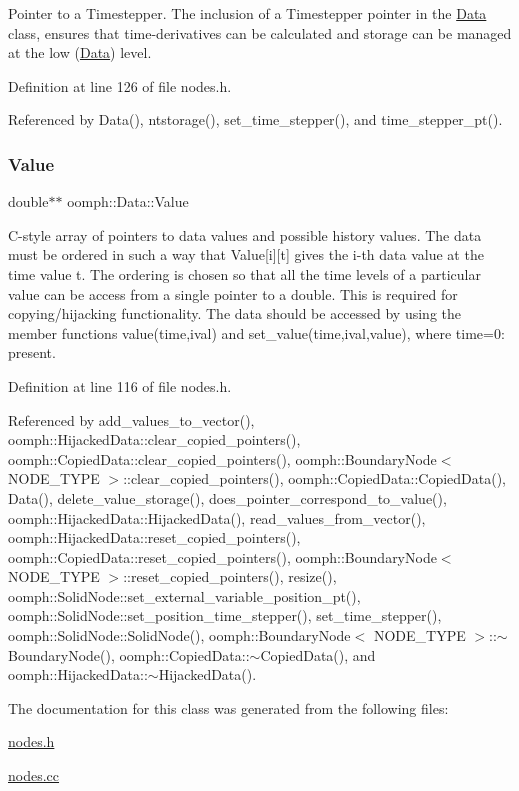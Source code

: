 Pointer to a Timestepper. The inclusion of a Timestepper pointer in the \hyperlink{classoomph_1_1Data}{Data} class, ensures that time-\/derivatives can be calculated and storage can be managed at the low (\hyperlink{classoomph_1_1Data}{Data}) level. 



Definition at line 126 of file nodes.\+h.



Referenced by Data(), ntstorage(), set\+\_\+time\+\_\+stepper(), and time\+\_\+stepper\+\_\+pt().

\mbox{\label{classoomph_1_1Data_aa69aab29cca43c9be329904807203ef1}} 
\subsubsection{\texorpdfstring{Value}{Value}}
{\footnotesize\ttfamily double$\ast$$\ast$ oomph\+::\+Data\+::\+Value\hspace{0.3cm}{\ttfamily [private]}}



C-\/style array of pointers to data values and possible history values. The data must be ordered in such a way that Value\mbox{[}i\mbox{]}\mbox{[}t\mbox{]} gives the i-\/th data value at the time value t. The ordering is chosen so that all the time levels of a particular value can be access from a single pointer to a double. This is required for copying/hijacking functionality. The data should be accessed by using the member functions value(time,ival) and set\+\_\+value(time,ival,value), where time=0\+: present. 



Definition at line 116 of file nodes.\+h.



Referenced by add\+\_\+values\+\_\+to\+\_\+vector(), oomph\+::\+Hijacked\+Data\+::clear\+\_\+copied\+\_\+pointers(), oomph\+::\+Copied\+Data\+::clear\+\_\+copied\+\_\+pointers(), oomph\+::\+Boundary\+Node$<$ N\+O\+D\+E\+\_\+\+T\+Y\+P\+E $>$\+::clear\+\_\+copied\+\_\+pointers(), oomph\+::\+Copied\+Data\+::\+Copied\+Data(), Data(), delete\+\_\+value\+\_\+storage(), does\+\_\+pointer\+\_\+correspond\+\_\+to\+\_\+value(), oomph\+::\+Hijacked\+Data\+::\+Hijacked\+Data(), read\+\_\+values\+\_\+from\+\_\+vector(), oomph\+::\+Hijacked\+Data\+::reset\+\_\+copied\+\_\+pointers(), oomph\+::\+Copied\+Data\+::reset\+\_\+copied\+\_\+pointers(), oomph\+::\+Boundary\+Node$<$ N\+O\+D\+E\+\_\+\+T\+Y\+P\+E $>$\+::reset\+\_\+copied\+\_\+pointers(), resize(), oomph\+::\+Solid\+Node\+::set\+\_\+external\+\_\+variable\+\_\+position\+\_\+pt(), oomph\+::\+Solid\+Node\+::set\+\_\+position\+\_\+time\+\_\+stepper(), set\+\_\+time\+\_\+stepper(), oomph\+::\+Solid\+Node\+::\+Solid\+Node(), oomph\+::\+Boundary\+Node$<$ N\+O\+D\+E\+\_\+\+T\+Y\+P\+E $>$\+::$\sim$\+Boundary\+Node(), oomph\+::\+Copied\+Data\+::$\sim$\+Copied\+Data(), and oomph\+::\+Hijacked\+Data\+::$\sim$\+Hijacked\+Data().



The documentation for this class was generated from the following files\+:\begin{DoxyCompactItemize}
\item 
\hyperlink{nodes_8h}{nodes.\+h}\item 
\hyperlink{nodes_8cc}{nodes.\+cc}\end{DoxyCompactItemize}
